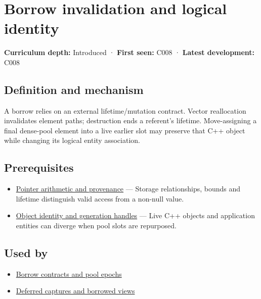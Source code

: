 \hypertarget{appendix-f9b8b9188c7f}{}\label{referencestart:appendix-f9b8b9188c7f}
\section{Borrow invalidation and logical identity}\label{appendix-f9b8b9188c7f-borrow-invalidation-and-logical-identity}

\textbf{Curriculum depth:} Introduced · \textbf{First seen:} C008 · \textbf{Latest development:} C008

\begin{allmightroledefinition}

\subsection{Definition and mechanism}\label{appendix-f9b8b9188c7f-definition-and-mechanism}

A borrow relies on an external lifetime/mutation contract. Vector reallocation invalidates element paths; destruction ends a referent's lifetime. Move-assigning a final dense-pool element into a live earlier slot may preserve that C++ object while changing its logical entity association.

\end{allmightroledefinition}

\subsection{Prerequisites}\label{appendix-f9b8b9188c7f-prerequisites}

\begin{itemize}
\tightlist
\item
  \hyperref[appendix-6af5921bc853]{Pointer arithmetic and provenance} --- Storage relationships, bounds and lifetime distinguish valid access from a non-null value.
\item
  \hyperref[appendix-f1581457d322]{Object identity and generation handles} --- Live C++ objects and application entities can diverge when pool slots are repurposed.
\end{itemize}

\subsection{Used by}\label{appendix-f9b8b9188c7f-used-by}

\begin{itemize}
\tightlist
\item
  \hyperref[appendix-aa405b7c3903]{Borrow contracts and pool epochs}
\item
  \hyperref[appendix-aea529eb5175]{Deferred captures and borrowed views}
\end{itemize}

